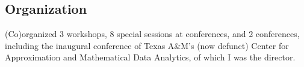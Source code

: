 \documentclass[11pt]{article}
\begin{document}
\subsection{Organization}

(Co)organized 3 workshops,
8 special sessions at conferences,
and 2 conferences, including the inaugural conference of Texas A\&M's (now defunct) Center for Approximation and Mathematical Data Analytics, of which I was the director.

\end{document}
